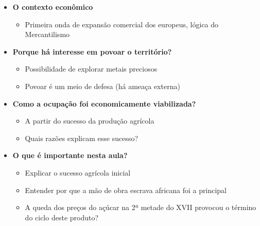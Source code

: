\documentclass[a4paper,12pt]{article}[abntex2]
\begin{document}
\begin{itemize}
    \item \textbf{O contexto econômico}
    \begin{itemize}
        \item Primeira onda de expansão comercial dos europeus, lógica do Mercantilismo
    \end{itemize}
    
    \item \textbf{Porque há interesse em povoar o território?}
    \begin{itemize}
        \item Possibilidade de explorar metais preciosos
        \item Povoar é um meio de defesa (há ameaça externa)
    \end{itemize}
    
    \item \textbf{Como a ocupação foi economicamente viabilizada?}
    \begin{itemize}
        \item A partir do sucesso da produção agrícola
        \item Quais razões explicam esse sucesso?
    \end{itemize}
    
    \item \textbf{O que é importante nesta aula?}
    \begin{itemize}
        \item Explicar o sucesso agrícola inicial
        \item Entender por que a mão de obra escrava africana foi a principal
        \item A queda dos preços do açúcar na 2ª metade do XVII provocou o término do ciclo deste produto?
    \end{itemize}
\end{itemize}
\end{document}
